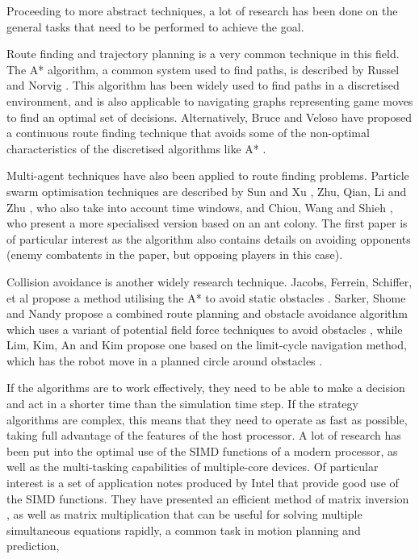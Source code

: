 \documentclass[a4paper,10pt]{article}
\begin{document}
Proceeding to more abstract techniques, a lot of research has been done on the general tasks that need to be performed to achieve the goal.

Route finding and trajectory planning is a very common technique in this field.  The A* algorithm, a common system used to find paths, is described by Russel and Norvig \cite{aiModernApproach}.  This algorithm has been widely used to find paths in a discretised environment, and is also applicable to navigating graphs representing game moves to find an optimal set of decisions.  Alternatively, Bruce and Veloso have proposed a continuous route finding technique that avoids some of the non-optimal characteristics of the discretised algorithms like A* \cite{realTimeRandomizedPathPlanning}.

Multi-agent techniques have also been applied to route finding problems.  Particle swarm optimisation techniques are described by Sun and Xu \cite{psoForUAV}, Zhu, Qian, Li and Zhu \cite{psoRouting}, who also take into account time windows, and Chiou, Wang and Shieh \cite{fuzzyAntColony}, who present a more specialised version based on an ant colony.  The first paper is of particular interest as the algorithm also contains details on avoiding opponents (enemy combatents in the paper, but opposing players in this case).

Collision avoidance is another widely research technique.  Jacobs, Ferrein, Schiffer, et al propose a method utilising the A* to avoid static obstacles \cite{robustRealTimeRoutePlanning}.  Sarker, Shome and Nandy propose a combined route planning and obstacle avoidance algorithm which uses a variant of potential field force techniques to avoid obstacles \cite{intelligentAlgorithmPathPlanning}, while Lim, Kim, An and Kim propose one based on the limit-cycle navigation method, which has the robot move in a planned circle around obstacles \cite{limitCycleNavigation}.

If the algorithms are to work effectively, they need to be able to make a decision and act in a shorter time than the simulation time step.  If the strategy algorithms are complex, this means that they need to operate as fast as possible, taking full advantage of the features of the host processor.  A lot of research has been put into the optimal use of the \ac{SIMD} functions of a modern processor, as well as the multi-tasking capabilities of multiple-core devices.  Of particular interest is a set of application notes produced by Intel that provide good use of the \ac{SIMD} functions.  They have presented an efficient method of matrix inversion \cite{intelMatrixInverse}, as well as matrix multiplication \cite{intelMatrixMultiply} that can be useful for solving multiple simultaneous equations rapidly, a common task in motion planning and prediction,
\end{document}
